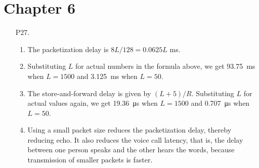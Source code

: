 \documentclass{article}
\begin{document}
\section*{Chapter 6}

\begin{enumerate}
    \item[P27.] \begin{enumerate}
        \item The packetization delay is $8L / 128 = 0.0625L$ ms.
        \item Substituting $L$ for actual numbers in the formula above, we get \SI{93.75}{ms} when $L = 1500$ and \SI{3.125}{ms} when $L = 50$.
        \item The store-and-forward delay is given by $(L + 5)/R$. Substituting $L$ for actual values again, we get \SI{19.36}{\micro\second} when $L = 1500$ and \SI{0.707}{\micro\second} when $L = 50$.
        \item Using a small packet size reduces the packetization delay, thereby reducing echo. It also reduces the voice call latency, that is, the delay between one person speaks and the other hears the words, because transmission of smaller packets is faster.
    \end{enumerate}
\end{enumerate}
\end{document}
